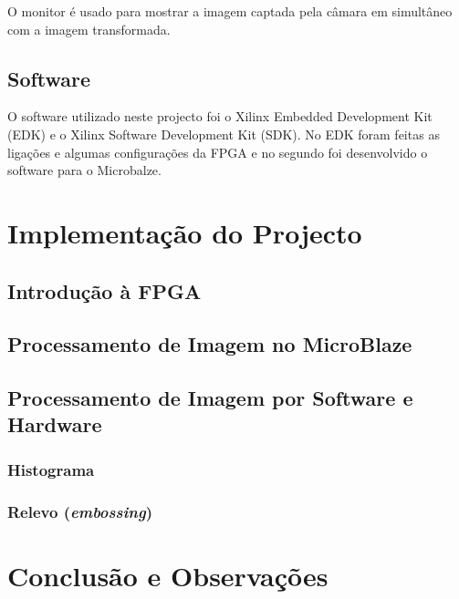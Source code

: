 \documentclass[a4paper]{article}
\begin{document}
O monitor é usado para mostrar a imagem captada pela câmara em simultâneo com a imagem transformada.

\subsection*{Software}
O software utilizado neste projecto foi o Xilinx Embedded Development Kit (EDK) e o Xilinx Software Development Kit (SDK). No EDK foram feitas as ligações e algumas configurações da FPGA e no segundo foi desenvolvido o software para o Microbalze.

\section{Implementação do Projecto}
\subsection{Introdução à FPGA}
\label{subsec:LEDs}

\subsection{Processamento de Imagem no MicroBlaze\texttrademark}

\subsection{Processamento de Imagem por Software e Hardware}
\subsubsection{Histograma}

\subsubsection{Relevo (\textit{embossing})}

\section{Conclusão e Observações}


\nocite{}
\end{document}
